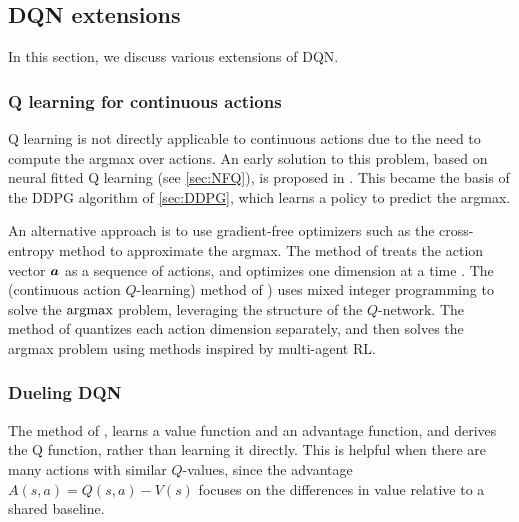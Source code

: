 \subsection{DQN extensions}
\label{sec:DQNextensions}

In this section, we discuss various extensions of DQN.

\subsubsection{Q learning for continuous actions}
\label{sec:QTopt}

Q learning is not directly applicable to continuous actions due to the need
to compute the argmax over actions.
An early solution to this problem,
based on neural fitted Q learning (see \cref{sec:NFQ}),
is proposed in \citep{Hafner2011}.
This became the basis of the 
DDPG algorithm of \cref{sec:DDPG},
which learns a policy to predict
the argmax.

An alternative  approach is to use gradient-free optimizers such as
the cross-entropy method to approximate the argmax.
The  method of \citep{QTopt}
treats  the action vector ${\bm{a}}$ as a sequence of actions,
and optimizes one dimension at a time \citep{Metz2017}.
The   (continuous action $Q$-learning) method
of \citep{CAQL})
uses mixed integer programming to solve the $\argmax$ problem,
leveraging the \relu structure  of the $Q$-network.
The method of \citep{Seyde2022} quantizes each action dimension separately,
and then solves the argmax problem using methods inspired by  multi-agent RL.

  

\subsubsection{Dueling DQN}
\label{sec:duelingDQN}

The   method of \citep{Wang2016dueling},
learns a value function and an advantage function,
and derives the Q function, rather than learning it directly.
  This is helpful  when there are many actions with similar
$Q$-values, since the advantage $A(s,a)=Q(s,a)-V(s)$ focuses
  on the differences in value relative to a shared baseline.

